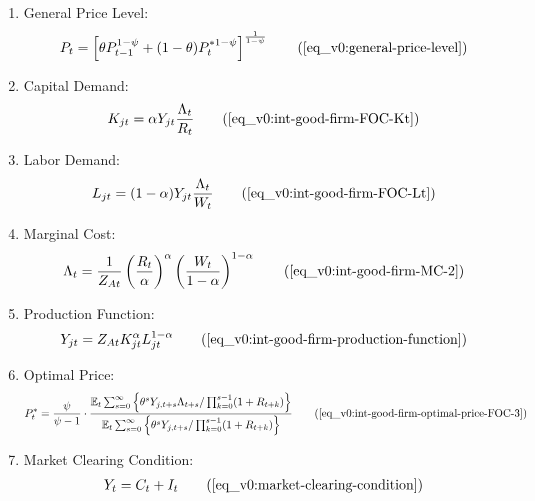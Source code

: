 \documentclass[
thesis.tex
]{subfiles}
\begin{document}
{\begin{itemize}
\begin{enumerate}
				\item General Price Level:
				\begin{align}
					P_t = \left[ \theta P_{t-1}^{1-\psi} + (1-\theta) P_t^{\ast 1-\psi} \right]^\frac{1}{1-\psi}
					\tag{\ref{eq_v0:general-price-level}}
				\end{align}
				
				\item Capital Demand:
				\begin{align}
					K_{jt} = \alpha Y_{jt} \frac{\Lambda_t}{R_t}
					\tag{\ref{eq_v0:int-good-firm-FOC-Kt}}
				\end{align}
				
				\item Labor Demand:
				\begin{align}
					L_{jt} = (1-\alpha) Y_{jt} \frac{\Lambda_t}{W_t}
					\tag{\ref{eq_v0:int-good-firm-FOC-Lt}}
				\end{align}
				
				
				\item Marginal Cost:
				\begin{align}
					\Lambda_t = \frac{1}{Z_{At}} \left( \frac{R_t}{\alpha} \right)^{\alpha} \left( \frac{W_t}{1-\alpha} \right)^{1-\alpha}
					\tag{\ref{eq_v0:int-good-firm-MC-2}}
				\end{align}
				
				\item Production Function:
				\begin{align}
					Y_{jt} = Z_{At} K_{jt}^\alpha L_{jt}^{1-\alpha}
					\tag{\ref{eq_v0:int-good-firm-production-function}}
				\end{align}
				
				\item Optimal Price:
				\begin{align}
					P_t^\ast = \frac{\psi}{\psi-1} \cdot \frac{ \E \sum_{s=0}^{\infty} \left\{ \theta^s Y_{j,t+s} \Lambda_{t+s} / \prod_{k=0}^{s-1}(1+R_{t+k}) \right\} } {\E \sum_{s=0}^{\infty} \left\{ \theta^s Y_{j,t+s} / \prod_{k=0}^{s-1}(1 + R_{t+k}) \right\}} \tag{\ref{eq_v0:int-good-firm-optimal-price-FOC-3}}
				\end{align}
				
				\item Market Clearing Condition:
				\begin{align}
					Y_t = C_t + I_t
					\tag{\ref{eq_v0:market-clearing-condition}}
				\end{align}
				

\end{enumerate}
\end{itemize}}
\end{document}
